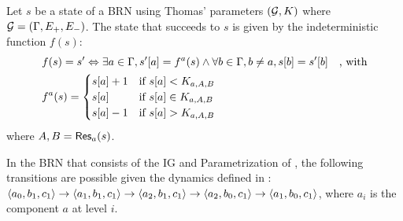 \begin{definition}\label{def:dynamics}
Let $s$ be a state of a BRN using Thomas' parameters $(\mathcal{G}, K)$ where $\mathcal{G} = (\Gamma, E_+, E_-)$.
The state that succeeds to $s$ is given by the indeterministic function $f(s)$:
\begin{align*}
  & f(s) = s' \Leftrightarrow \exists a \in \Gamma,
    \GRNget{s'}{a} = f^a(s) \wedge
    \forall b \in \Gamma, b \neq a, \GRNget{s}{b} = \GRNget{s'}{b}
    \quad\text{, with}\\
  & f^a(s) =
  \begin{cases}
    \GRNget{s}{a} + 1 & \text{if } \GRNget{s}{a} < K_{a,A,B} \\%
    \GRNget{s}{a} & \text{if } \GRNget{s}{a} \in K_{a,A,B} \\ %
    \GRNget{s}{a} - 1 & \text{if } \GRNget{s}{a} > K_{a,A,B} %
  \end{cases}
\end{align*}
where $A,B=\mathsf{Res}_{a}(s)$.
\end{definition}

\begin{example*}
In the BRN that consists of the IG and Parametrization of , the following transitions are possible given the dynamics defined in :
$\mbox{$\langle a_0, b_1, c_1 \rangle$} \rightarrow \mbox{$\langle a_1, b_1, c_1 \rangle$} \rightarrow \mbox{$\langle a_2, b_1, c_1 \rangle$} \rightarrow
\mbox{$\langle a_2, b_0, c_1 \rangle$} \rightarrow \mbox{$\langle a_1, b_0, c_1 \rangle$}$,
where $a_i$ is the component $a$ at level $i$.
\end{example*}

